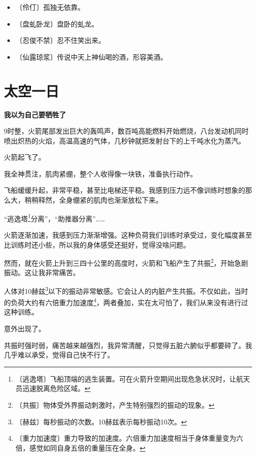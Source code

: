 \documentclass[12pt,UTF-8,openany]{ctexbook}
\begin{document}
\begin{itemize}
    \setlength\itemsep{-0.2em}
    \item 〔伶仃〕孤独无依靠。
    \item 〔盘虬卧龙〕盘卧的虬龙。
    \item 〔忍俊不禁〕忍不住笑出来。
    \item 〔仙露琼浆〕传说中天上神仙喝的酒，形容美酒。
\end{itemize}

\chapter{太空一日}

\begin{normalsize}
    
    \begin{large}\textbf{我以为自己要牺牲了}\end{large}
    
    9时整，火箭尾部发出巨大的轰鸣声，数百吨高能燃料开始燃烧，八台发动机同时喷出炽热的火焰，高温高速的气体，几秒钟就把发射台下的上千吨水化为蒸汽。
    
    火箭起飞了。
    
    我全神贯注，肌肉紧绷，整个人收得像一块铁，准备执行动作。
    
    飞船缓缓升起，非常平稳，甚至比电梯还平稳。我感到压力远不像训练时想象的那么大，稍稍释然，全身绷紧的肌肉也渐渐放松下来。
    
    “逃逸塔\footnote{〔逃逸塔〕飞船顶端的逃生装置。可在火箭升空期间出现危急状况时，让航天员迅速脱离危险区域。}分离”，“助推器分离”……
    
    火箭逐渐加速，我感到压力渐渐增强。这种负荷我们训练时承受过，变化幅度甚至比训练时还小些，所以我的身体感受还挺好，觉得没啥问题。
    
    然而，就在火箭上升到三四十公里的高度时，火箭和飞船产生了共振\footnote{〔共振〕物体受外界振动刺激时，产生特别强烈的振动的现象。}，开始急剧振动。这让我非常痛苦。
    
    人体对10赫兹\footnote{〔赫兹〕每秒振动的次数。10赫兹表示每秒振动10次。}以下的振动非常敏感。它会让人的内脏产生共振。不仅如此，当时的负荷大约有六倍重力加速度\footnote{〔重力加速度〕重力导致的加速度。六倍重力加速度相当于身体重量变为六倍，感觉如同自身五倍的重量压在全身。}，两者叠加，实在太可怕了，我们从来没有进行过这种训练。
    
    意外出现了。
    
    共振时强时弱，痛苦越来越强烈，我异常清醒，只觉得五脏六腑似乎都要碎了。我几乎难以承受，觉得自己快不行了。
    

\end{normalsize}
\end{document}
